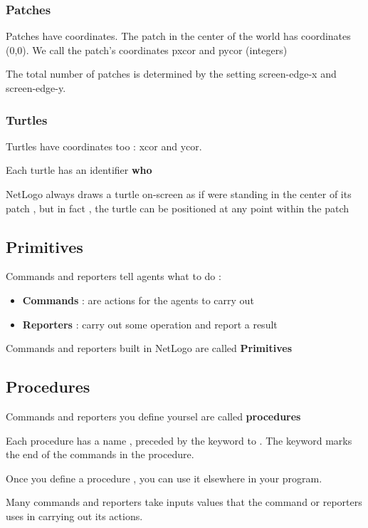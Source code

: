 \documentclass{article}
\begin{document}
\subsubsection{Patches}

Patches have coordinates. The patch in the center of the world has coordinates (0,0). We call the patch's coordinates pxcor and pycor (integers)

The total number of patches is determined by the setting screen-edge-x and screen-edge-y.

\subsubsection{Turtles}

Turtles have coordinates too : xcor and ycor.

Each turtle has an identifier \textbf{who}

NetLogo always draws a turtle on-screen as if were standing in the center of its patch , but in fact , the turtle can be positioned at any point within the patch

\subsection{Primitives}

Commands and reporters tell agents what to do :

\begin{itemize}
    \item \textbf{Commands} : are actions for the agents to carry out
    \item \textbf{Reporters} : carry out some operation and report a result
\end{itemize}

Commands and reporters built in NetLogo are called \textbf{Primitives}

\subsection{Procedures}

Commands and reporters you define yoursel are called \textbf{procedures}

Each procedure has a name , preceded by the keyword to . The keyword marks the end of the commands in the procedure.

Once you define a procedure , you can use it elsewhere in your program.

Many commands and reporters take inputs values that the command or reporters uses in carrying out its actions.
\end{document}
